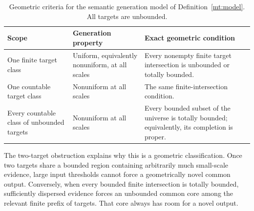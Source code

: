 \begin{table}[tbp]
\centering
\small
\begin{tabular}{@{}p{.24\linewidth}p{.28\linewidth}p{.39\linewidth}@{}}
\toprule
Scope & Generation property & Exact geometric condition\\
\midrule
One finite target class & Uniform, equivalently nonuniform, at all scales &
Every nonempty finite target intersection is unbounded or totally bounded.\\[5pt]
One countable target class & Nonuniform at all scales &
The same finite-intersection condition.\\[5pt]
Every countable class of unbounded targets & Nonuniform at all scales &
Every bounded subset of the universe is totally bounded; equivalently,
its completion is proper.\\
\bottomrule
\end{tabular}
\caption{Geometric criteria for the semantic generation model of
Definition~\ref{mt:model}. All targets are unbounded.}
\label{mt:table}
\end{table}

The two-target obstruction explains why this is a geometric classification.
Once two targets share a bounded region containing arbitrarily much
small-scale evidence, large input thresholds cannot force a geometrically
novel common output. Conversely, when every bounded finite intersection
is totally bounded, sufficiently dispersed evidence forces an unbounded
common core among the relevant finite prefix of targets. That core always
has room for a novel output.

